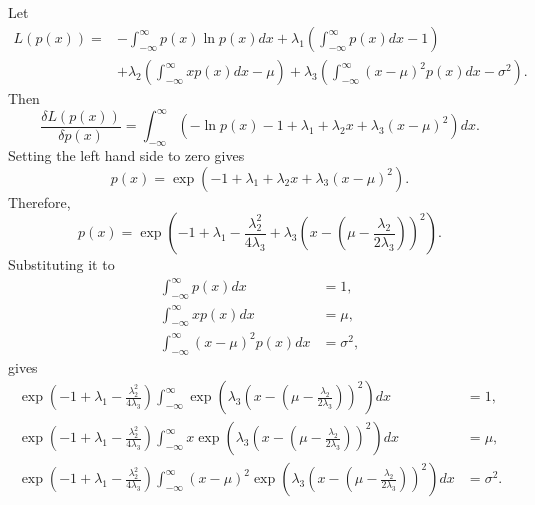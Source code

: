 \subsection{}
Let
%
\begin{equation}
\begin{aligned}
L(p(x)) = &- \int_{- \infty}^{\infty} p(x) \ln p(x) dx + \lambda_1 \left( \int_{- \infty}^{\infty} p(x) dx - 1 \right) \\
&+ \lambda_2 \left( \int_{- \infty}^{\infty} x p(x) dx - \mu \right) + \lambda_3 \left( \int_{-\infty}^{\infty} (x - \mu) ^ 2 p(x) dx - \sigma ^ 2 \right).
\end{aligned}
\end{equation}
%
Then
%
\begin{equation}
\frac{\delta L(p(x))}{\delta p(x)} = \int_{- \infty}^{\infty} \left( - \ln p(x) - 1 + \lambda_1 + \lambda_2 x + \lambda_3 (x - \mu) ^ 2 \right) dx.
\end{equation}
%
Setting the left hand side to zero gives
%
\begin{equation}
p(x) = \exp \left( - 1 + \lambda_1 + \lambda_2 x + \lambda_3 (x - \mu) ^ 2 \right).
\end{equation}
%
Therefore,
%
\begin{equation}
p(x) = \exp \left( - 1 + \lambda_1 - \frac{\lambda_2 ^ 2}{4 \lambda_3} + \lambda_3 \left( x - \left( \mu - \frac{\lambda_2}{2 \lambda_3} \right) \right) ^ 2 \right).
\end{equation}
%
Substituting it to 
%
\begin{equation}
\begin{aligned}
\int_{- \infty}^{\infty} p(x) dx &= 1, \\
\int_{- \infty}^{\infty} x p(x) dx &= \mu, \\
\int_{- \infty}^{\infty} (x - \mu) ^ 2 p(x) dx &= \sigma ^ 2,
\end{aligned}
\end{equation}
%
gives
%
\begin{equation}
\begin{aligned}
\exp \left( - 1 + \lambda_1 - \frac{\lambda_2 ^ 2}{4 \lambda_3} \right) \int_{- \infty}^{\infty} \exp \left( \lambda_3 \left( x - \left( \mu - \frac{\lambda_2}{2 \lambda_3} \right) \right) ^ 2 \right) dx &= 1, \\
\exp \left( - 1 + \lambda_1 - \frac{\lambda_2 ^ 2}{4 \lambda_3} \right) \int_{- \infty}^{\infty} x \exp \left( \lambda_3 \left( x - \left( \mu - \frac{\lambda_2}{2 \lambda_3} \right) \right) ^ 2 \right) dx &= \mu, \\
\exp \left( - 1 + \lambda_1 - \frac{\lambda_2 ^ 2}{4 \lambda_3} \right) \int_{- \infty}^{\infty} (x - \mu) ^ 2 \exp \left( \lambda_3 \left( x - \left( \mu - \frac{\lambda_2}{2 \lambda_3} \right) \right) ^ 2 \right) dx &= \sigma ^ 2.
\end{aligned}
\end{equation}
